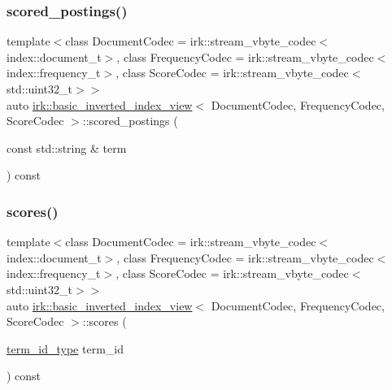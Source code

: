\subsubsection{\texorpdfstring{scored\+\_\+postings()}{scored\_postings()}\hspace{0.1cm}{\footnotesize\ttfamily [2/2]}}
{\footnotesize\ttfamily template$<$class Document\+Codec  = irk\+::stream\+\_\+vbyte\+\_\+codec$<$index\+::document\+\_\+t$>$, class Frequency\+Codec  = irk\+::stream\+\_\+vbyte\+\_\+codec$<$index\+::frequency\+\_\+t$>$, class Score\+Codec  = irk\+::stream\+\_\+vbyte\+\_\+codec$<$std\+::uint32\+\_\+t$>$$>$ \\
auto \mbox{\hyperlink{classirk_1_1basic__inverted__index__view}{irk\+::basic\+\_\+inverted\+\_\+index\+\_\+view}}$<$ Document\+Codec, Frequency\+Codec, Score\+Codec $>$\+::scored\+\_\+postings (\begin{DoxyParamCaption}\item[{const std\+::string \&}]{term }\end{DoxyParamCaption}) const\hspace{0.3cm}{\ttfamily [inline]}}

\mbox{\label{classirk_1_1basic__inverted__index__view_a91c355845935ffa26fd6a07e5a8b9201}} 
\subsubsection{\texorpdfstring{scores()}{scores()}}
{\footnotesize\ttfamily template$<$class Document\+Codec  = irk\+::stream\+\_\+vbyte\+\_\+codec$<$index\+::document\+\_\+t$>$, class Frequency\+Codec  = irk\+::stream\+\_\+vbyte\+\_\+codec$<$index\+::frequency\+\_\+t$>$, class Score\+Codec  = irk\+::stream\+\_\+vbyte\+\_\+codec$<$std\+::uint32\+\_\+t$>$$>$ \\
auto \mbox{\hyperlink{classirk_1_1basic__inverted__index__view}{irk\+::basic\+\_\+inverted\+\_\+index\+\_\+view}}$<$ Document\+Codec, Frequency\+Codec, Score\+Codec $>$\+::scores (\begin{DoxyParamCaption}\item[{\mbox{\hyperlink{classirk_1_1basic__inverted__index__view_a6b272abc76df208ce59bac93810e7331}{term\+\_\+id\+\_\+type}}}]{term\+\_\+id }\end{DoxyParamCaption}) const\hspace{0.3cm}{\ttfamily [inline]}}

